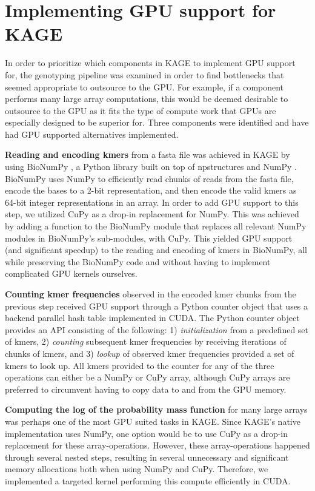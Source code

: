 \section*{Implementing GPU support for KAGE}\label{impl}
In order to prioritize which components in KAGE to implement GPU support for, the genotyping pipeline was examined in order to find bottlenecks that seemed appropriate to outsource to the GPU.
For example, if a component performs many large array computations, this would be deemed desirable to outsource to the GPU as it fits the type of compute work that GPUs are especially designed to be superior for.
Three components were identified and have had GPU supported alternatives implemented.

\textbf{Reading and encoding kmers} from a fasta file was achieved in KAGE by using BioNumPy \cite{bionumpy}, a Python library built on top of npstructures \cite{npstructures} and NumPy \cite{numpy}.
BioNumPy uses NumPy to efficiently read chunks of reads from the fasta file, encode the bases to a 2-bit representation, and then encode the valid kmers as 64-bit integer representations in an array.
In order to add GPU support to this step, we utilized CuPy \cite{cupy} as a drop-in replacement for NumPy.
This was achieved by adding a function to the BioNumPy module that replaces all relevant NumPy modules in BioNumPy's sub-modules, with CuPy.
This yielded GPU support (and significant speedup) to the reading and encoding of kmers in BioNumPy, all while preserving the BioNumPy code and without having to implement complicated GPU kernels ourselves.

\textbf{Counting kmer frequencies} observed in the encoded kmer chunks from the previous step received GPU support through a Python counter object that uses a backend parallel hash table implemented in CUDA.
The Python counter object provides an API consisting of the following:
1) \textit{initialization} from a predefined set of kmers, 
2) \textit{counting} subsequent kmer frequencies by receiving iterations of chunks of kmers, and 
3) \textit{lookup} of observed kmer frequencies provided a set of kmers to look up.
All kmers provided to the counter for any of the three operations can either be a NumPy or CuPy array, although CuPy arrays are preferred to circumvent having to copy data to and from the GPU memory.

\textbf{Computing the log of the probability mass function} for many large arrays was perhaps one of the most GPU suited tasks in KAGE.
Since KAGE's native implementation uses NumPy, one option would be to use CuPy as a drop-in replacement for these array-operations. 
However, these array-operations happened through several nested steps, resulting in several unnecessary and significant memory allocations both when using NumPy and CuPy.
Therefore, we implemented a targeted kernel performing this compute efficiently in CUDA.

